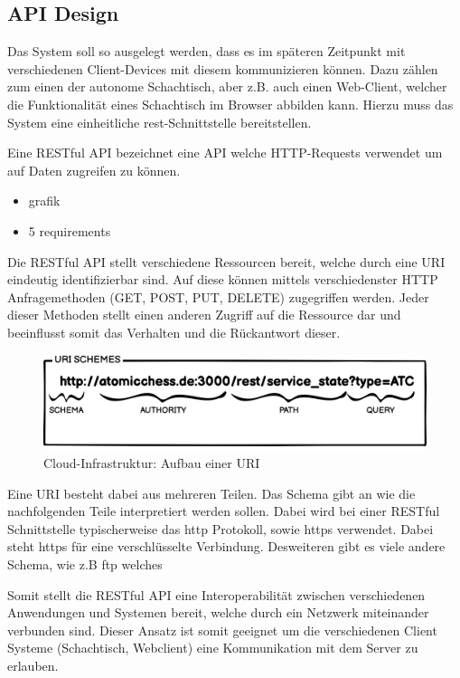 \hypertarget{api-design}{%
\subsection{API Design}\label{api-design}}

Das System soll so ausgelegt werden, dass es im späteren Zeitpunkt mit
verschiedenen Client-Devices mit diesem kommunizieren können. Dazu
zählen zum einen der autonome Schachtisch, aber z.B. auch einen
Web-Client, welcher die Funktionalität eines Schachtisch im Browser
abbilden kann. Hierzu muss das System eine einheitliche
\gls{rest}-Schnittstelle bereitstellen.

Eine RESTful API bezeichnet eine API welche HTTP-Requests verwendet um
auf Daten zugreifen zu können.

\begin{itemize}
\tightlist
\item
  grafik
\item
  5 requirements
\end{itemize}

Die RESTful API stellt verschiedene Ressourcen bereit, welche durch eine
URI eindeutig identifizierbar sind. Auf diese können mittels
verschiedenster HTTP Anfragemethoden (GET, POST, PUT, DELETE)
zugegriffen werden. Jeder dieser Methoden stellt einen anderen Zugriff
auf die Ressource dar und beeinflusst somit das Verhalten und die
Rückantwort dieser.

\begin{figure}
\centering
\includegraphics{images/ATC_URI_SCHEMES.png}
\caption{Cloud-Infrastruktur: Aufbau einer URI}
\end{figure}

Eine URI besteht dabei aus mehreren Teilen. Das Schema gibt an wie die
nachfolgenden Teile interpretiert werden sollen. Dabei wird bei einer
RESTful Schnittstelle typischerweise das \gls{http} Protokoll, sowie
\gls{https} verwendet. Dabei steht \gls{https} für eine verschlüsselte
Verbindung. Desweiteren gibt es viele andere Schema, wie z.B \gls{ftp}
welches

Somit stellt die RESTful API eine Interoperabilität zwischen
verschiedenen Anwendungen und Systemen bereit, welche durch ein Netzwerk
miteinander verbunden sind. Dieser Ansatz ist somit geeignet um die
verschiedenen Client Systeme (Schachtisch, Webclient) eine Kommunikation
mit dem Server zu erlauben.


